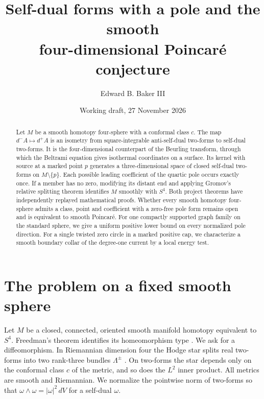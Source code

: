 \documentclass[11pt,letterpaper]{article}
\title{Self-dual forms with a pole and the smooth\\four-dimensional Poincar\'e conjecture}
\author{Edward B. Baker III}
\date{Working draft, 27 November 2026}
\numberwithin{equation}{section}
\begin{document}
\maketitle
\begin{abstract}
Let \(M\) be a smooth homotopy four-sphere with a conformal class \(c\).
The map \(d^-A\mapsto d^+A\) is an isometry from square-integrable
anti-self-dual two-forms to self-dual two-forms. It is the
four-dimensional counterpart of the Beurling transform, through which
the Beltrami equation gives isothermal coordinates on a surface. Its
kernel with source at a marked point \(p\) generates a three-dimensional
space of closed self-dual two-forms on \(M\setminus\{p\}\). Each possible
leading coefficient of the quartic pole occurs exactly once. If a member
has no zero, modifying its distant end and applying Gromov's relative
splitting theorem identifies \(M\) smoothly with \(S^4\). Both project
theorems have independently replayed mathematical proofs. Whether every
smooth homotopy four-sphere admits a class, point and coefficient with a
zero-free pole form remains open and is equivalent to smooth Poincar\'e.
For one compactly supported graph family on the standard sphere, we give
a uniform positive lower bound on every normalized pole direction.
For a single twisted zero circle in a marked positive cap, we characterize
a smooth boundary collar of the degree-one current by a local energy test.

\end{abstract}

\section{The problem on a fixed smooth sphere}

Let \(M\) be a closed, connected, oriented smooth manifold homotopy
equivalent to \(S^4\). Freedman's theorem identifies its homeomorphism
type \cite[Theorem~1.6]{Freedman1982}. We ask for a diffeomorphism. In Riemannian
dimension four the Hodge star splits real two-forms into two rank-three
bundles \(\Lambda^\pm\) \cite{AHS1978}. On two-forms the star depends
only on the conformal class \(c\) of the metric, and so does the \(L^2\)
inner product. All metrics are smooth and Riemannian. We normalize the
pointwise norm of two-forms so that
\(\omega\wedge\omega=|\omega|^2\,dV\) for a self-dual \(\omega\).
\end{document}
